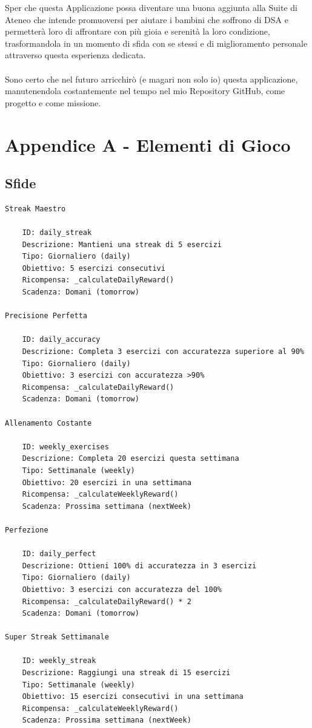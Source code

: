 \documentclass[14pt]{extbook}
\begin{document}
Sper che questa Applicazione possa diventare una buona aggiunta alla Suite di Ateneo che intende promuoversi per aiutare i bambini che soffrono di DSA e permetterà loro di affrontare con più gioia e serenità la loro condizione, trasformandola in un momento di sfida con se stessi e di miglioramento personale attraverso questa esperienza dedicata.\\\\

Sono certo che nel futuro arricchirò (e magari non solo io) questa applicazione, manutenendola costantemente nel tempo nel mio Repository GitHub, come progetto e come missione.
\pagebreak
\clearpage
\chapter{Appendice A - Elementi di Gioco}
\section{Sfide}
\begin{lstlisting}[caption=Elenco Sfide, label=lst:Sfide]
Streak Maestro

    ID: daily_streak
    Descrizione: Mantieni una streak di 5 esercizi
    Tipo: Giornaliero (daily)
    Obiettivo: 5 esercizi consecutivi
    Ricompensa: _calculateDailyReward()
    Scadenza: Domani (tomorrow)

Precisione Perfetta

    ID: daily_accuracy
    Descrizione: Completa 3 esercizi con accuratezza superiore al 90%
    Tipo: Giornaliero (daily)
    Obiettivo: 3 esercizi con accuratezza >90%
    Ricompensa: _calculateDailyReward()
    Scadenza: Domani (tomorrow)

Allenamento Costante

    ID: weekly_exercises
    Descrizione: Completa 20 esercizi questa settimana
    Tipo: Settimanale (weekly)
    Obiettivo: 20 esercizi in una settimana
    Ricompensa: _calculateWeeklyReward()
    Scadenza: Prossima settimana (nextWeek)

Perfezione

    ID: daily_perfect
    Descrizione: Ottieni 100% di accuratezza in 3 esercizi
    Tipo: Giornaliero (daily)
    Obiettivo: 3 esercizi con accuratezza del 100%
    Ricompensa: _calculateDailyReward() * 2
    Scadenza: Domani (tomorrow)

Super Streak Settimanale

    ID: weekly_streak
    Descrizione: Raggiungi una streak di 15 esercizi
    Tipo: Settimanale (weekly)
    Obiettivo: 15 esercizi consecutivi in una settimana
    Ricompensa: _calculateWeeklyReward()
    Scadenza: Prossima settimana (nextWeek)
\end{lstlisting}
\pagebreak
\end{document}

